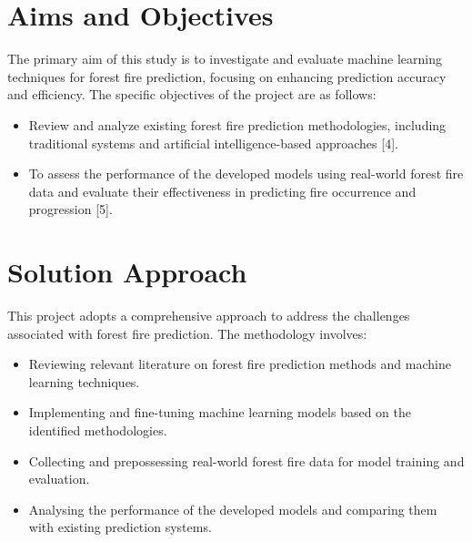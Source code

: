 \section{Aims and Objectives}
The primary aim of this study is to investigate and evaluate machine learning techniques for forest fire prediction, focusing on enhancing prediction accuracy and efficiency. The specific objectives of the project are as follows:
\begin{itemize}
     
    \item Review and analyze existing forest fire prediction methodologies, including traditional systems and artificial intelligence-based approaches [4].
    \item To assess the performance of the developed models using real-world forest fire data and evaluate their effectiveness in predicting fire occurrence and progression [5].

\end{itemize}


\section{Solution Approach}
This project adopts a comprehensive approach to address the challenges associated with forest fire prediction. The methodology involves:
\begin{itemize}
    \item Reviewing relevant literature on forest fire prediction methods and machine learning techniques.
    \item Implementing and fine-tuning machine learning models based on the identified methodologies.
    \item Collecting and prepossessing real-world forest fire data for model training and evaluation.
    \item Analysing the performance of the developed models and comparing them with existing prediction systems.
\end{itemize}

